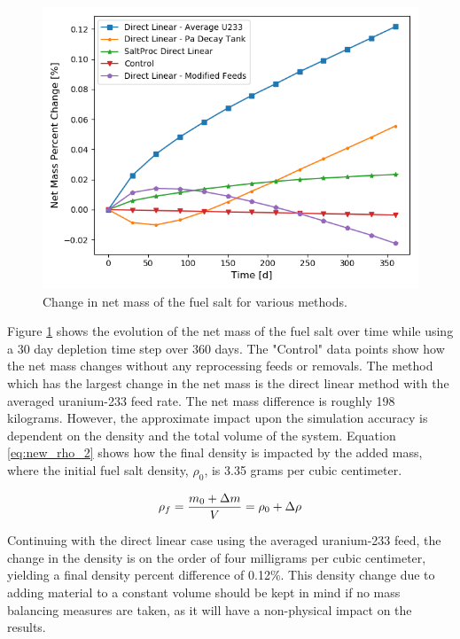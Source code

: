 \begin{figure}[H]
  \centering
  \includegraphics[scale=0.7]{images/net-mass-pcnt-change.png}
  \caption{Change in net mass of the fuel salt for various methods.}
   \label{fig:net-mass-bal}
\end{figure}

Figure \ref{fig:net-mass-bal} shows the evolution of the net mass of the fuel salt over time while using a 30 day depletion time step over 360 days. The "Control" data points show how the net mass changes without any reprocessing feeds or removals. 
The method which has the largest change in the net mass is the direct linear method with the averaged uranium-233 feed rate. The net mass difference is roughly 198 kilograms. 
However, the approximate impact upon the simulation accuracy is dependent on the density and the total volume of the system. Equation \eqref{eq:new_rho_2} shows how the final density is impacted by the added mass, where the initial fuel salt density, $\rho_0$, is 3.35 grams per cubic centimeter. 

\begin{equation} \hfill
\rho_f = \frac{m_0 + \Delta m}{V} = \rho_0 + \Delta \rho
\hfill\label{eq:new_rho_2} \end{equation}

Continuing with the direct linear case using the averaged uranium-233 feed, the change in the density is on the order of four milligrams per cubic centimeter, yielding a final density percent difference of 0.12\%. This density change due to adding material to a constant volume should be kept in mind if no mass balancing measures are taken, as it will have a non-physical impact on the results.



